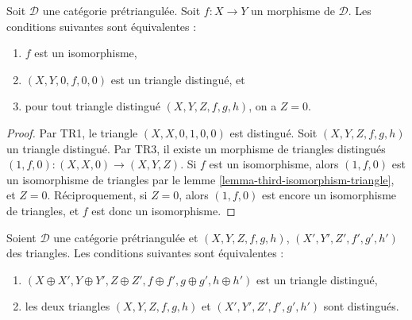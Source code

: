 \begin{lemma}
\label{lemma-third-object-zero}
Soit $\mathcal{D}$ une catégorie prétriangulée. Soit $f : X \to Y$ un
morphisme de $\mathcal{D}$. Les conditions suivantes sont équivalentes :
\begin{enumerate}
\item $f$ est un isomorphisme,
\item $(X, Y, 0, f, 0, 0)$ est un triangle distingué, et
\item pour tout triangle distingué $(X, Y, Z, f, g, h)$, on a $Z = 0$.
\end{enumerate}
\end{lemma}

\begin{proof}
Par TR1, le triangle $(X, X, 0, 1, 0, 0)$ est distingué. Soit
$(X, Y, Z, f, g, h)$ un triangle distingué. Par TR3, il existe un morphisme de
triangles distingués $(1, f, 0) : (X, X, 0) \to (X, Y, Z)$. Si $f$ est un
isomorphisme, alors $(1, f, 0)$ est un isomorphisme de triangles par le
lemme \ref{lemma-third-isomorphism-triangle}, et $Z = 0$. Réciproquement, si
$Z = 0$, alors $(1, f, 0)$ est encore un isomorphisme de triangles, et $f$ est
donc un isomorphisme.
\end{proof}

\begin{lemma}
\label{lemma-direct-sum-triangles}
Soient $\mathcal{D}$ une catégorie prétriangulée et
$(X, Y, Z, f, g, h)$, $(X', Y', Z', f', g', h')$ des triangles. Les conditions
suivantes sont équivalentes :
\begin{enumerate}
\item $(X \oplus X', Y \oplus Y', Z \oplus Z',
f \oplus f', g \oplus g', h \oplus h')$ est un triangle distingué,
\item les deux triangles $(X, Y, Z, f, g, h)$ et
$(X', Y', Z', f', g', h')$ sont distingués.
\end{enumerate}
\end{lemma}

